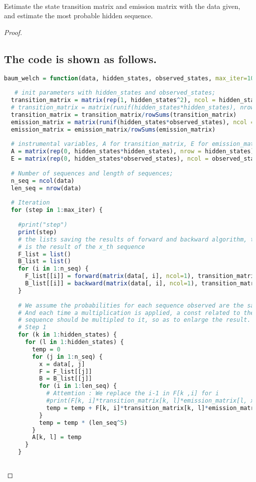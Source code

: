 \documentclass{article}
\newenvironment{problem}[2][Problem]{\begin{trivlist}
\item[\hskip \labelsep {\bfseries #1}\hskip \labelsep {\bfseries #2.}]}{\end{trivlist}}
\begin{document}
\begin{problem}{5}
\text{ }\\
Estimate the state transition matrix and emission matrix with the data given, and estimate the most probable hidden sequence.
\end{problem}

\begin{proof}
\subsection{The code is shown as follows.}
\begin{lstlisting}[language = {R}]
baum_welch = function(data, hidden_states, observed_states, max_iter=1000, max_error=1e-8) {
 
   # init parameters with hidden_states and observed_states;
  transition_matrix = matrix(rep(1, hidden_states^2), ncol = hidden_states)
  # transition_matrix = matrix(runif(hidden_states*hidden_states), nrow = hidden_states)
  transition_matrix = transition_matrix/rowSums(transition_matrix)
  emission_matrix = matrix(runif(hidden_states*observed_states), ncol = observed_states)
  emission_matrix = emission_matrix/rowSums(emission_matrix)
  
  # instrumental variables, A for transition_matrix, E for emission_matrix
  A = matrix(rep(0, hidden_states*hidden_states), nrow = hidden_states)
  E = matrix(rep(0, hidden_states*observed_states), ncol = observed_states)
  
  # Number of sequences and length of sequences;
  n_seq = ncol(data)
  len_seq = nrow(data)
  
  # Iteration
  for (step in 1:max_iter) {
    
    #print("step")
    print(step)
    # the lists saving the results of forward and backward algorithm, the x_th element 
    # is the result of the x_th sequence
    F_list = list()
    B_list = list()
    for (i in 1:n_seq) {
      F_list[[i]] = forward(matrix(data[, i], ncol=1), transition_matrix, emission_matrix)
      B_list[[i]] = backward(matrix(data[, i], ncol=1), transition_matrix, emission_matrix)
    }
    
    # We assume the probabilities for each sequence observed are the same;
    # And each time a multiplication is applied, a const related to the length of the
    # sequence should be multipled to it, so as to enlarge the result.
    # Step 1
    for (k in 1:hidden_states) {
      for (l in 1:hidden_states) {
        temp = 0
        for (j in 1:n_seq) {
          x = data[, j]
          F = F_list[[j]]
          B = B_list[[j]]
          for (i in 1:len_seq) {
            # Attemtion : We replace the i-1 in F[k ,i] for i
            #print(F[k, i]*transition_matrix[k, l]*emission_matrix[l, x[i]]*B[l, i])
            temp = temp + F[k, i]*transition_matrix[k, l]*emission_matrix[l, x[i]]*B[l, i]
          }
          temp = temp * (len_seq^5)
        }
        A[k, l] = temp
      }
    }
    

\end{lstlisting}
\end{proof}
\end{document}
